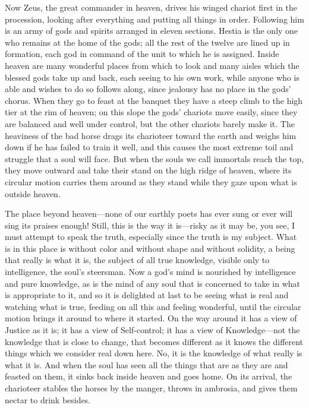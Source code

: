 Now Zeus, the great commander in heaven, drives his winged chariot
first in the procession, looking after everything and putting all things
in order. Following him is an army of gods and spirits arranged in
eleven sections. Hestia is the only one who remains at
the home of the gods; all the rest of the twelve are lined up in
formation, each god in command of the unit to which he is assigned.
Inside heaven are many wonderful places from which to look and many
aisles which the blessed gods take up and back, each seeing to his own
work, while anyone who is able and wishes to do so follows along, since
jealousy has no place in the gods’ chorus. When they go to feast at the
banquet they have a steep climb to the high tier at the rim of
heaven; on this slope the gods’ chariots move easily, since they are
balanced and well under control, but the other chariots barely make it.
The heaviness of the bad horse drags its charioteer toward the earth and
weighs him down if he has failed to train it well, and this causes the
most extreme toil and struggle that a soul will face. But when the souls
we call immortals reach the top, they move outward and take their stand
on the high ridge of heaven, where its circular motion carries 
them around as they stand while they gaze upon what is outside heaven.

The place beyond heaven---none of our earthly poets has ever sung or
ever will sing its praises enough! Still, this is the way it is---risky
as it may be, you see, I must attempt to speak the truth, especially
since the truth is my subject. What is in this place is without color
and without shape and without solidity, a being that really is what it
is, the subject of all true knowledge, visible only to intelligence, the
soul’s steersman. Now a god’s mind is nourished by intelligence
and pure knowledge, as is the mind of any soul that is concerned to take
in what is appropriate to it, and so it is delighted at last to be
seeing what is real and watching what is true, feeding on all this and
feeling wonderful, until the circular motion brings it around to where
it started. On the way around it has a view of Justice as it is; it has
a view of Self-control; it has a view of Knowledge---not the knowledge
that is close to change, that becomes different as it knows the
different things which we consider real down here. No, it is the
knowledge of what really is what it is. And when the soul has
seen all the things that are as they are and feasted on them, it sinks
back inside heaven and goes home. On its arrival, the charioteer stables
the horses by the manger, throws in ambrosia, and gives them nectar to
drink besides.

